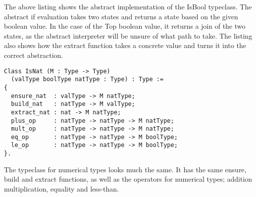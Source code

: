 The above listing shows the abstract implementation of the IsBool typeclass.
The abstract if evaluation takes two states and returns a state based on the
given boolean value. In the case of the Top boolean value, it returns a join of
the two states, as the abstract interpreter will be unsure of what path to
take. The listing also shows how the extract function takes a concrete value
and turns it into the correct abstraction.

\begin{verbatim}
Class IsNat (M : Type -> Type)
  (valType boolType natType : Type) : Type :=
{
  ensure_nat  : valType -> M natType;
  build_nat   : natType -> M valType;
  extract_nat : nat -> M natType;
  plus_op     : natType -> natType -> M natType;
  mult_op     : natType -> natType -> M natType;
  eq_op       : natType -> natType -> M boolType;
  le_op       : natType -> natType -> M boolType;
}.
\end{verbatim}

The typeclass for numerical types looks much the same. It has the same ensure,
build and extract functions, as well as the operators for numerical types;
addition multiplication, equality and less-than.

